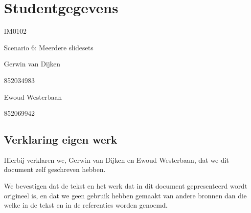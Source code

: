 \documentclass[a4paper]{article}
\begin{document}
\pagestyle{fancy}

\section*{Studentgegevens}
\begin{description}
	\item [Cursuscode] IM0102
	\item Scenario 6: Meerdere slidesets
	\item [Naam] Gerwin van Dijken
	\item [Studentnummer] 852034983
	\item [Naam] Ewoud Westerbaan
	\item [Studentnummer] 852069942
\end{description}

\subsection*{Verklaring eigen werk}
Hierbij verklaren we, Gerwin van Dijken en Ewoud Westerbaan, dat we dit document zelf geschreven hebben.
\par
We bevestigen dat de tekst en het werk dat in dit document gepresenteerd wordt origineel is, en dat we geen gebruik hebben gemaakt van andere bronnen dan die welke in de tekst en in de referenties worden genoemd.
\end{document}

